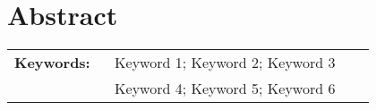 \section*{Abstract}


\lipsum[1-2]

%
\vfill
%
{\centering %
\begin{tabular}{p{0.25\linewidth} p{0.65\linewidth}}
	\textbf{\Large Keywords:} 	& Keyword 1; Keyword 2; Keyword 3 \\ %
								& Keyword 4; Keyword 5; Keyword 6    %
\end{tabular}
}